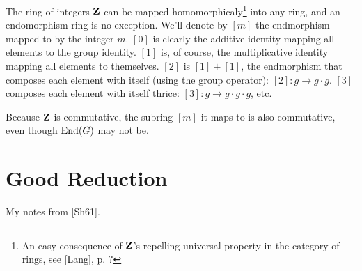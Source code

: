 The ring of integers ${\bf Z}$ can be mapped homomorphicaly\footnote{An easy
consequence of ${\bf Z}$'s repelling universal property in the category of
rings, see [Lang], p. ?} into any ring, and an endomorphism ring is no
exception.  We'll denote by $[m]$ the endmorphism mapped to by the
integer $m$. $[0]$ is clearly the additive identity mapping all
elements to the group identity.  $[1]$ is, of course, the
multiplicative identity mapping all elements to themselves.  $[2]$ is
$[1]+[1]$, the endmorphism that composes each element with itself
(using the group operator): $[2]: g \to g\cdot g$.  $[3]$ composes
each element with itself thrice: $[3]: g \to g\cdot g\cdot g$, etc.

Because ${\bf Z}$ is commutative, the subring $[m]$ it maps to is also
commutative, even though ${\rm End}(G)$ may not be.



\section{Good Reduction}

My notes from [Sh61].

